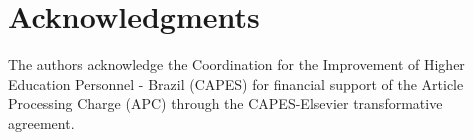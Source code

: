 \documentclass[12pt,english]{elsarticle}
\theoremstyle{plain}
\theoremstyle{plain}
\theoremstyle{remark}
\theoremstyle{plain}
\theoremstyle{definition}
\theoremstyle{definition}
\begin{document}


%

\section{Acknowledgments}
The authors acknowledge the Coordination for the Improvement of Higher Education Personnel - Brazil (CAPES) for financial support of the Article Processing Charge (APC) through the CAPES-Elsevier transformative agreement.


\medskip{}
\medskip{}

\medskip{}
\medskip{}
\medskip{}
\end{document}
